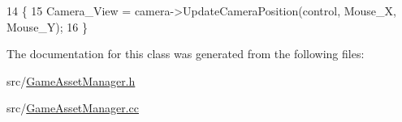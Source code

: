 \begin{DoxyCode}
14                                                                                      \{
15         Camera\_View = camera->UpdateCameraPosition(control, Mouse\_X, Mouse\_Y);
16 \}
\end{DoxyCode}


The documentation for this class was generated from the following files\+:\begin{DoxyCompactItemize}
\item 
src/\hyperlink{_game_asset_manager_8h}{Game\+Asset\+Manager.\+h}\item 
src/\hyperlink{_game_asset_manager_8cc}{Game\+Asset\+Manager.\+cc}\end{DoxyCompactItemize}

